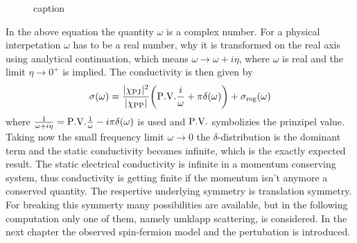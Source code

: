 %
\begin{figure}[t]
	\caption{caption}
	\label{fig:conductivity broken and unbroken translation symmetry}
\end{figure}
%
In the above equation the quantity $\omega$ is a complex number.
For a physical interpetation $\omega$ has to be a real number, why it is transformed on the real axis using analytical continuation, which means $\omega \to \omega + i\eta$, where $\omega$ is real and the limit $\eta \to 0^{+}$ is implied.
The conductivity is then given by
%
\begin{align}
	\sigma(\omega) = \frac{\vert\chi_{\mt{PJ}}\vert^{2}}{\vert\chi_{\mt{PP}}\vert} \bigg(\PV{\frac{i}{\omega}} + \pi \delta(\omega) \bigg) + \sigma_{\mt{reg}}(\omega)
	\label{eq:conductivity unpertubed system}
\end{align}
%
where $\frac{1}{\omega + i\eta} = \PV{\frac{1}{\omega}} - i\pi\delta(\omega)$ is used and $\PV$ symbolizies the prinzipel value.
Taking now the small frequency limit $\omega \to 0$ the $\delta$-distribution is the dominant term and the static conductivity becomes infinite, which is the exactly expected result.
The static electrical conductivity is infinite in a momentum conserving system, thus conductivity is getting finite if the momentum isn't anymore a conserved quantity.
The respertive underlying symmetry is translation symmetry.
For breaking this symmerty many possibilities are available, but in the following computation only one of them, namely umklapp scattering, is considered.
In the next chapter the observed spin-fermion model and the pertubation is introduced.
























